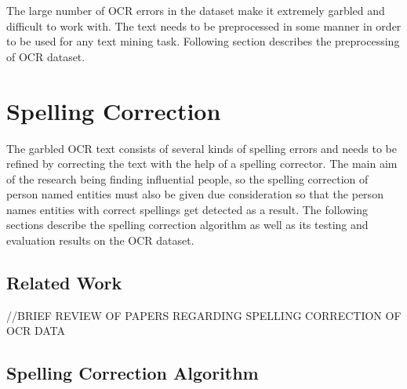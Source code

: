 \documentclass[letterpaper,11pt]{report}
\begin{document}
The large number of OCR errors in the dataset make it extremely garbled and difficult to work with. The text needs to be preprocessed in some manner in order to be used for any text mining task. Following section describes the preprocessing of OCR dataset.

\section{Spelling Correction}
 The garbled OCR text consists of several kinds of spelling errors and needs to be refined by correcting the text with the help of a spelling corrector. The main aim of the research being finding influential people, so the spelling correction of person named entities must also be given due consideration so that the person names entities with correct spellings get detected as a result.
The following sections describe the spelling correction algorithm as well as its testing and evaluation results on the OCR dataset.

\subsection{Related Work}
//BRIEF REVIEW OF PAPERS REGARDING SPELLING CORRECTION OF OCR DATA

\subsection{Spelling Correction Algorithm}
\end{document}
